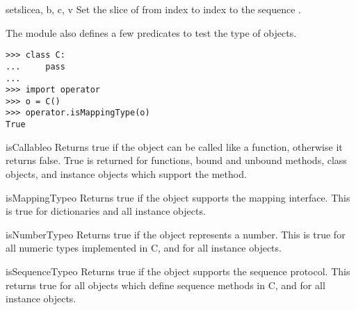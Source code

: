 \begin{funcdesc}{setslice}{a, b, c, v}
Set the slice of  from index  to index  to the
sequence .
\end{funcdesc}


The  module also defines a few predicates to test the
type of objects.  

\begin{verbatim}
>>> class C:
...     pass
... 
>>> import operator
>>> o = C()
>>> operator.isMappingType(o)
True
\end{verbatim}

\begin{funcdesc}{isCallable}{o}
Returns true if the object  can be called like a function,
otherwise it returns false.  True is returned for functions, bound and
unbound methods, class objects, and instance objects which support the
 method.
\end{funcdesc}

\begin{funcdesc}{isMappingType}{o}
Returns true if the object  supports the mapping interface.
This is true for dictionaries and all instance objects.
\end{funcdesc}

\begin{funcdesc}{isNumberType}{o}
Returns true if the object  represents a number.  This is true
for all numeric types implemented in C, and for all instance objects.
\end{funcdesc}

\begin{funcdesc}{isSequenceType}{o}
Returns true if the object  supports the sequence protocol.
This returns true for all objects which define sequence methods in C,
and for all instance objects.  
\end{funcdesc}


